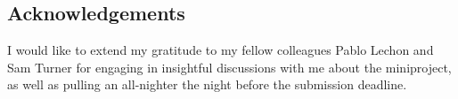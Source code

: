 \documentclass[11pt]{article}
\begin{document}
\begin{linenumbers}
	\section{Acknowledgements}
	I would like to extend my gratitude to my fellow colleagues Pablo Lechon and Sam Turner for engaging in insightful discussions with me about the miniproject, as well as pulling an all-nighter the night before the submission deadline.
	
	\end{linenumbers}

	
    
\end{document}
